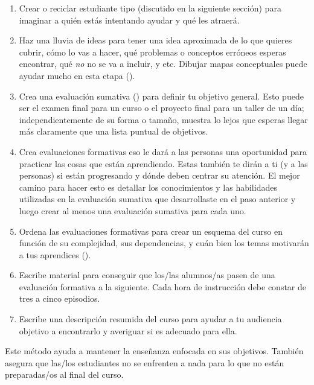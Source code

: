 \begin{enumerate}
 
\item
Crear o reciclar estudiante tipo (discutido en la siguiente sección)
para imaginar a quién estás intentando ayudar y qué les atraerá.

 \item
Haz una lluvia de ideas para tener una idea aproximada de lo que quieres cubrir,
cómo lo vas a hacer,
qué problemas o conceptos erróneos esperas encontrar,
qué \emph{no} no se va a incluir,
y etc.
Dibujar mapas conceptuales puede ayudar mucho en esta etapa ().
 
\item
Crea una evaluación sumativa ()
para definir tu objetivo general.
Esto puede ser el examen final para un curso
o el proyecto final para un taller de un día;
independientemente de su forma o tamaño,
muestra lo lejos que esperas llegar
más claramente que una lista puntual de objetivos.
 
\item
Crea evaluaciones formativas
eso le dará a las personas una oportunidad para practicar las cosas que están aprendiendo.
Estas también te dirán a ti (y a las personas) si están progresando
y dónde deben centrar su atención.
El mejor camino para hacer esto es detallar los conocimientos y las habilidades
utilizadas en la evaluación sumativa que desarrollaste en el paso anterior y
luego crear al menos una evaluación sumativa para cada uno.
 
\item
Ordena las evaluaciones formativas para crear un esquema del curso
en función de su complejidad,
sus dependencias,
y cuán bien los temas motivarán a tus aprendices ().
 
\item
Escribe material para conseguir que los/las alumnos/as pasen de una evaluación formativa a la siguiente.
Cada hora de instrucción debe constar de tres a cinco episodios.
 
\item
Escribe una descripción resumida del curso
para ayudar a tu audiencia objetivo a encontrarlo
y averiguar si es adecuado para ella.
 \end{enumerate}
 
Este método ayuda a mantener la enseñanza enfocada en sus objetivos.
También asegura que las/los estudiantes no se enfrenten a nada para lo que no están preparadas/os al final del curso.
 
